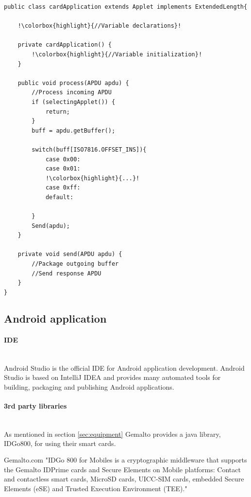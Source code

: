 \begin{lstlisting}[caption=Pseudo code for javacard test application., label=lst:pseudoCard,escapechar=!]
public class cardApplication extends Applet implements ExtendedLength{

    !\colorbox{highlight}{//Variable declarations}!

    private cardApplication() {
    	!\colorbox{highlight}{//Variable initialization}!
    }

    public void process(APDU apdu) {
    	//Process incoming APDU
        if (selectingApplet()) {
			return;
		}
        buff = apdu.getBuffer();

    	switch(buff[ISO7816.OFFSET_INS]){
            case 0x00:
            case 0x01:
            !\colorbox{highlight}{...}!
            case 0xff:
            default:

    	}
    	Send(apdu);
    }

    private void send(APDU apdu) {
    	//Package outgoing buffer
    	//Send response APDU
    }
}
\end{lstlisting}

\subsection{Android application}
\paragraph{IDE}\mbox{}\\
Android Studio \cite{androidIDE} is the official IDE for Android application development. Android Studio is based on IntelliJ IDEA \cite{intelliJIDEA} and provides many automated tools for building, packaging and publishing Android applications.
\paragraph{3rd party libraries}\mbox{}\\
As mentioned in section \ref{sec:equipment} Gemalto provides a java library, IDGo800, for using their smart cards.

\begin{aquote}{Gemalto.com \cite{GemaltoIDGo800}}
"IDGo 800 for Mobiles is a cryptographic middleware that supports the Gemalto IDPrime cards and Secure Elements on Mobile platforms: Contact and contactless smart cards, MicroSD cards, UICC-SIM cards, embedded Secure Elements (eSE) and Trusted Execution Environment (TEE)."
\end{aquote}


